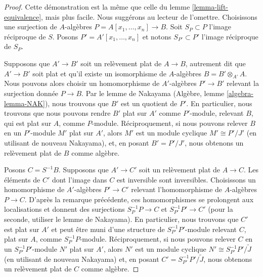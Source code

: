 \begin{proof}
Cette démonstration est la même que celle du
lemme \ref{lemma-lift-equivalence}, mais plus facile. Nous suggérons au
lecteur de l'omettre.
Choisissons une surjection de $A$-algèbres $P = A[x_1, \ldots, x_n] \to B$.
Soit $S_P \subset P$ l'image réciproque de $S$.
Posons $P' = A'[x_1, \ldots, x_n]$ et notons $S_{P'} \subset P'$
l'image réciproque de $S_P$.

\medskip\noindent
Supposons que $A' \to B'$ soit un relèvement plat de $A \to B$, autrement dit
que $A' \to B'$ soit plat et qu'il existe un isomorphisme de $A$-algèbres
$B = B' \otimes_{A'} A$. Nous pouvons alors choisir un homomorphisme de $A'$-algèbres
$P' \to B'$ relevant la surjection donnée $P \to B$.
Par le lemme de Nakayama (Algèbre, lemme \ref{algebra-lemma-NAK}),
nous trouvons que $B'$ est un quotient de $P'$. En particulier, nous trouvons
que nous pouvons rendre $B'$ plat sur $A'$ comme $P'$-module,
relevant $B$, qui est plat sur $A$, comme $P$-module.
Réciproquement, si nous pouvons relever $B$ en un $P'$-module $M'$ plat sur $A'$,
alors $M'$ est un module cyclique $M' \cong P'/J'$ (en utilisant de nouveau Nakayama),
et, en posant $B' = P'/J'$, nous obtenons un relèvement plat de $B$ comme algèbre.

\medskip\noindent
Posons $C = S^{-1}B$. Supposons que $A' \to C'$ soit un relèvement plat de $A \to C$.
Les éléments de $C'$ dont l'image dans $C$ est inversible sont inversibles.
Choisissons un homomorphisme de $A'$-algèbres $P' \to C'$ relevant
l'homomorphisme de $A$-algèbres $P \to C$. D'après la remarque précédente,
ces homomorphismes se prolongent aux localisations et donnent des surjections
$S_P^{-1}P \to C$ et $S_{P'}^{-1}P' \to C'$
(pour la seconde, utiliser le lemme de Nakayama).
En particulier, nous trouvons que $C'$ est plat sur $A'$ et peut être muni d'une structure de
$S_{P'}^{-1}P'$-module relevant $C$, plat sur $A$, comme
$S_P^{-1}P$-module. Réciproquement, si nous pouvons relever $C$ en un
$S_{P'}^{-1}P'$-module $N'$ plat sur $A'$, alors $N'$
est un module cyclique $N' \cong S_{P'}^{-1}P'/\tilde J$
(en utilisant de nouveau Nakayama) et, en posant $C' = S_{P'}^{-1}P'/\tilde J$,
nous obtenons un relèvement plat de $C$ comme algèbre.


\end{proof}

